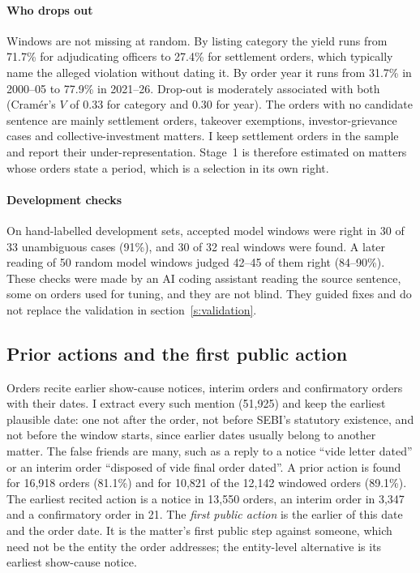 \documentclass[letterpaper,11pt,leqno]{article}
\begin{document}
\paragraph{Who drops out} Windows are not missing at random. By listing category the yield runs from 71.7\% for adjudicating officers to 27.4\% for settlement orders, which typically name the alleged violation without dating it. By order year it runs from 31.7\% in 2000--05 to 77.9\% in 2021--26. Drop-out is moderately associated with both (Cram\'er's $V$ of 0.33 for category and 0.30 for year). The orders with no candidate sentence are mainly settlement orders, takeover exemptions, investor-grievance cases and collective-investment matters. I keep settlement orders in the sample and report their under-representation. Stage~1 is therefore estimated on matters whose orders state a period, which is a selection in its own right.

\paragraph{Development checks} On hand-labelled development sets, accepted model windows were right in 30 of 33 unambiguous cases (91\%), and 30 of 32 real windows were found. A later reading of 50 random model windows judged 42--45 of them right (84--90\%). These checks were made by an AI coding assistant reading the source sentence, some on orders used for tuning, and they are not blind. They guided fixes and do not replace the validation in section~\ref{s:validation}.

\subsection{Prior actions and the first public action}\label{s:actions}

Orders recite earlier show-cause notices, interim orders and confirmatory orders with their dates. I extract every such mention (51,925) and keep the earliest plausible date: one not after the order, not before SEBI's statutory existence, and not before the window starts, since earlier dates usually belong to another matter. The false friends are many, such as a reply to a notice ``vide letter dated'' or an interim order ``disposed of vide final order dated''. A prior action is found for 16,918 orders (81.1\%) and for 10,821 of the 12,142 windowed orders (89.1\%). The earliest recited action is a notice in 13,550 orders, an interim order in 3,347 and a confirmatory order in 21. The \emph{first public action} is the earlier of this date and the order date. It is the matter's first public step against someone, which need not be the entity the order addresses; the entity-level alternative is its earliest show-cause notice.
\end{document}
